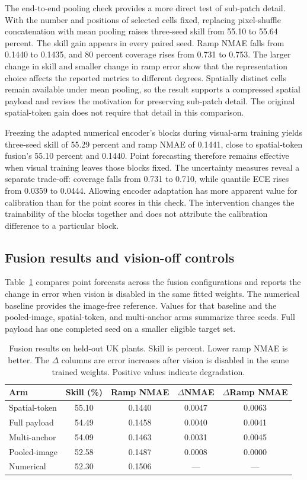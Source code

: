 The end-to-end pooling check provides a more direct test of sub-patch detail. With the number and positions of selected cells fixed, replacing pixel-shuffle concatenation with mean pooling raises three-seed skill from 55.10 to 55.64 percent. The skill gain appears in every paired seed. Ramp NMAE falls from 0.1440 to 0.1435, and 80 percent coverage rises from 0.731 to 0.753. The larger change in skill and smaller change in ramp error show that the representation choice affects the reported metrics to different degrees. Spatially distinct cells remain available under mean pooling, so the result supports a compressed spatial payload and revises the motivation for preserving sub-patch detail. The original spatial-token gain does not require that detail in this comparison.

Freezing the adapted numerical encoder's blocks during visual-arm training yields three-seed skill of 55.29 percent and ramp NMAE of 0.1441, close to spatial-token fusion's 55.10 percent and 0.1440. Point forecasting therefore remains effective when visual training leaves those blocks fixed. The uncertainty measures reveal a separate trade-off: coverage falls from 0.731 to 0.710, while quantile ECE rises from 0.0359 to 0.0444. Allowing encoder adaptation has more apparent value for calibration than for the point scores in this check. The intervention changes the trainability of the blocks together and does not attribute the calibration difference to a particular block.

\subsection{Fusion results and vision-off controls}

Table~\ref{tab:ablation-ladder} compares point forecasts across the fusion configurations and reports the change in error when vision is disabled in the same fitted weights. The numerical baseline provides the image-free reference. Values for that baseline and the pooled-image, spatial-token, and multi-anchor arms summarize three seeds. Full payload has one completed seed on a smaller eligible target set.

\begin{table}[htbp]
\centering
\begin{tabular}{@{}lcccc@{}}
\hline
Arm & Skill (\%) & Ramp NMAE & $\Delta$NMAE & $\Delta$Ramp NMAE \\
\hline
Spatial-token & 55.10 & 0.1440 & 0.0047 & 0.0063 \\
Full payload & 54.49 & 0.1458 & 0.0040 & 0.0041 \\
Multi-anchor & 54.09 & 0.1463 & 0.0031 & 0.0045 \\
Pooled-image & 52.58 & 0.1487 & 0.0008 & 0.0000 \\
Numerical & 52.30 & 0.1506 & --- & --- \\
\hline
\end{tabular}
\caption{Fusion results on held-out UK plants. Skill is percent. Lower ramp NMAE is better. The $\Delta$ columns are error increases after vision is disabled in the same trained weights. Positive values indicate degradation.}
\label{tab:ablation-ladder}
\end{table}

